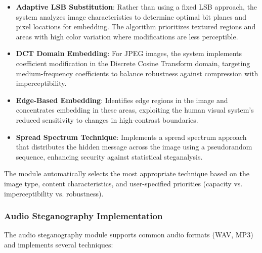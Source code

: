 \documentclass[12pt, a4paper, oneside]{book}
\begin{document}
\begin{itemize}[leftmargin=*]
    \item \textbf{Adaptive LSB Substitution}: Rather than using a fixed LSB approach, the system analyzes image characteristics to determine optimal bit planes and pixel locations for embedding. The algorithm prioritizes textured regions and areas with high color variation where modifications are less perceptible.

    \item \textbf{DCT Domain Embedding}: For JPEG images, the system implements coefficient modification in the Discrete Cosine Transform domain, targeting medium-frequency coefficients to balance robustness against compression with imperceptibility.

    \item \textbf{Edge-Based Embedding}: Identifies edge regions in the image and concentrates embedding in these areas, exploiting the human visual system's reduced sensitivity to changes in high-contrast boundaries.

    \item \textbf{Spread Spectrum Technique}: Implements a spread spectrum approach that distributes the hidden message across the image using a pseudorandom sequence, enhancing security against statistical steganalysis.
\end{itemize}

The module automatically selects the most appropriate technique based on the image type, content characteristics, and user-specified priorities (capacity vs. imperceptibility vs. robustness).

\subsubsection{Audio Steganography Implementation}
The audio steganography module supports common audio formats (WAV, MP3) and implements several techniques:
\end{document}
